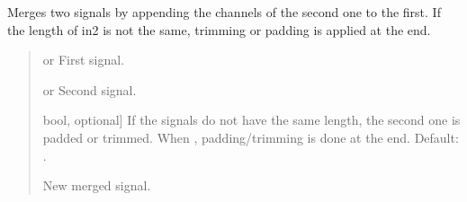 \documentclass[letterpaper,10pt,english]{sphinxmanual}
\begin{document}
\begin{fulllineitems}
\label{\detokenize{modules/dsptools.standard_functions:dsptools.standard_functions.merge_signals}}
\pysigstartsignatures
{}
\pysigstopsignatures
\sphinxAtStartPar
Merges two signals by appending the channels of the second one to the
first. If the length of in2 is not the same, trimming or padding is
applied at the end.
\begin{quote}\begin{description}
\begin{description}
\sphinxlineitem{\sphinxstylestrong{in1}}{[} or \sphinxtitleref{MultiBandSignal}{]}
\sphinxAtStartPar
First signal.

\sphinxlineitem{\sphinxstylestrong{in2}}{[} or \sphinxtitleref{MultiBandSignal}{]}
\sphinxAtStartPar
Second signal.

\sphinxlineitem{\sphinxstylestrong{trimming\_at\_end}}{[}bool, optional{]}
\sphinxAtStartPar
If the signals do not have the same length, the second one is padded
or trimmed. When , padding/trimming is done at the end.
Default: .

\end{description}

\begin{description}
\sphinxlineitem{\sphinxstylestrong{new\_sig}}{[}\sphinxtitleref{Signal}{]}
\sphinxAtStartPar
New merged signal.

\end{description}

\end{description}\end{quote}

\end{fulllineitems}

\end{document}
